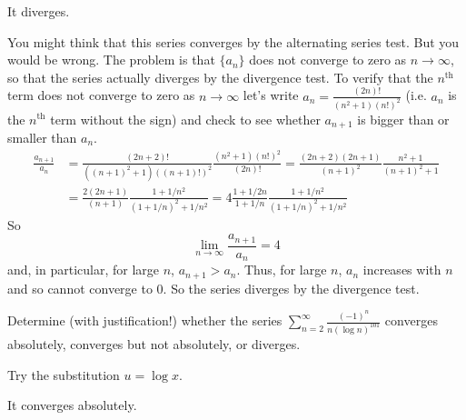 \begin{answer}
It diverges.
\end{answer}

\begin{solution}
You might think that this series converges by the alternating series test.
But you would be wrong. The problem is that $\{a_n\}$ does not converge to zero as $n\rightarrow\infty$, so that the series actually
diverges by the divergence test. To verify that the $n^{\text{th}}$ term does not converge to zero as $n\rightarrow\infty$ let's write
$a_n= \frac{(2n)!}{(n^2+1)(n!)^2}$ (i.e. $a_n$ is the $n^{\text{th}}$ term
without the sign) and check to see whether $a_{n+1}$ is bigger than or smaller than $a_n$.
\begin{align*}
\frac{a_{n+1}}{a_n}
&=\frac{(2n+2)!}{((n+1)^2+1)((n+1)!)^2}
\frac{(n^2+1)(n!)^2}{(2n)!}
=\frac{(2n+2)(2n+1)}{(n+1)^2}\frac{n^2+1}{(n+1)^2+1} \\
&=\frac{2(2n+1)}{(n+1)}\frac{1+1/n^2}{(1+1/n)^2+1/n^2}
=4\frac{1+1/2n}{1+1/n}\frac{1+1/n^2}{(1+1/n)^2+1/n^2}
\end{align*}
So
\begin{equation*}
\lim_{n\rightarrow\infty}\frac{a_{n+1}}{a_n}=4
\end{equation*}
and, in particular, for large $n$, $a_{n+1}>a_n$. Thus, for large $n$,
$a_n$ increases with $n$ and so cannot converge to $0$. So the series
diverges by the divergence test.
\end{solution}

\begin{Mquestion}[2012A]
Determine (with justification!) whether the series
$\displaystyle\sum_{n=2}^\infty\frac{(-1)^n}{n(\log n)^{101}}$
converges absolutely, converges but not absolutely, or diverges.
\end{Mquestion}

\begin{hint}
Try the substitution $u=\log x$.
\end{hint}

\begin{answer}
It converges absolutely.
\end{answer}

